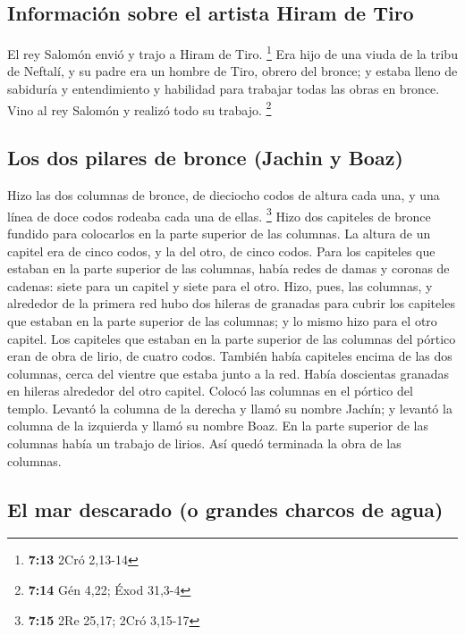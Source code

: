 \hypertarget{informaciuxf3n-sobre-el-artista-hiram-de-tiro}{%
\subsection{Información sobre el artista Hiram de
Tiro}\label{informaciuxf3n-sobre-el-artista-hiram-de-tiro}}

 El rey Salomón envió y trajo a Hiram de Tiro.
\footnote{\textbf{7:13} 2Cró 2,13-14}  Era hijo de una
viuda de la tribu de Neftalí, y su padre era un hombre de Tiro, obrero
del bronce; y estaba lleno de sabiduría y entendimiento y habilidad para
trabajar todas las obras en bronce. Vino al rey Salomón y realizó todo
su trabajo. \footnote{\textbf{7:14} Gén 4,22; Éxod 31,3-4}

\hypertarget{los-dos-pilares-de-bronce-jachin-y-boaz}{%
\subsection{Los dos pilares de bronce (Jachin y
Boaz)}\label{los-dos-pilares-de-bronce-jachin-y-boaz}}

 Hizo las dos columnas de bronce, de dieciocho codos de
altura cada una, y una línea de doce codos rodeaba cada una de ellas.
\footnote{\textbf{7:15} 2Re 25,17; 2Cró 3,15-17}  Hizo
dos capiteles de bronce fundido para colocarlos en la parte superior de
las columnas. La altura de un capitel era de cinco codos, y la del otro,
de cinco codos.  Para los capiteles que estaban en la
parte superior de las columnas, había redes de damas y coronas de
cadenas: siete para un capitel y siete para el otro. 
Hizo, pues, las columnas, y alrededor de la primera red hubo dos hileras
de granadas para cubrir los capiteles que estaban en la parte superior
de las columnas; y lo mismo hizo para el otro capitel. 
Los capiteles que estaban en la parte superior de las columnas del
pórtico eran de obra de lirio, de cuatro codos.  También
había capiteles encima de las dos columnas, cerca del vientre que estaba
junto a la red. Había doscientas granadas en hileras alrededor del otro
capitel.  Colocó las columnas en el pórtico del templo.
Levantó la columna de la derecha y llamó su nombre Jachín; y levantó la
columna de la izquierda y llamó su nombre Boaz.  En la
parte superior de las columnas había un trabajo de lirios. Así quedó
terminada la obra de las columnas.

\hypertarget{el-mar-descarado-o-grandes-charcos-de-agua}{%
\subsection{El mar descarado (o grandes charcos de
agua)}\label{el-mar-descarado-o-grandes-charcos-de-agua}}

